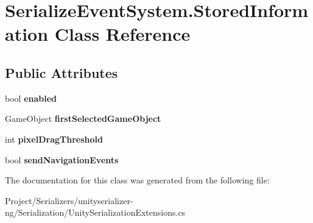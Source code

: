 \hypertarget{class_serialize_event_system_1_1_stored_information}{}\section{Serialize\+Event\+System.\+Stored\+Information Class Reference}
\label{class_serialize_event_system_1_1_stored_information}
\subsection*{Public Attributes}
\begin{DoxyCompactItemize}
\item 
\mbox{\label{class_serialize_event_system_1_1_stored_information_aba544e4d75c5c4178b25a5465ce8a4a0}} 
bool {\bfseries enabled}
\item 
\mbox{\label{class_serialize_event_system_1_1_stored_information_a8fd79365c55621844ee467dd188e4cec}} 
Game\+Object {\bfseries first\+Selected\+Game\+Object}
\item 
\mbox{\label{class_serialize_event_system_1_1_stored_information_a25f5b619e8acbcafe57dbc9ea2adbb70}} 
int {\bfseries pixel\+Drag\+Threshold}
\item 
\mbox{\label{class_serialize_event_system_1_1_stored_information_a33a91656b50f4b8030d2caf7a44fff11}} 
bool {\bfseries send\+Navigation\+Events}
\end{DoxyCompactItemize}


The documentation for this class was generated from the following file\+:\begin{DoxyCompactItemize}
\item 
Project/\+Serializers/unityserializer-\/ng/\+Serialization/Unity\+Serialization\+Extensions.\+cs\end{DoxyCompactItemize}
